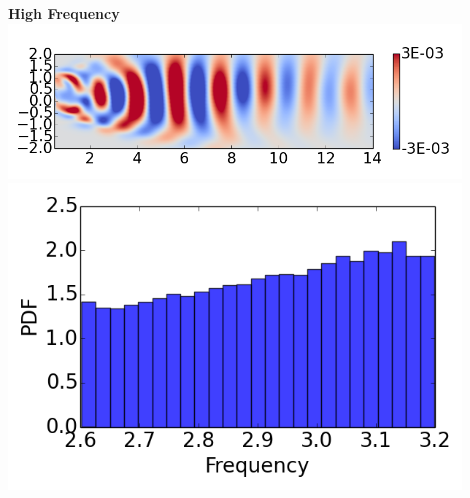\documentclass[9pt]{beamer}
\begin{document}
\begin{frame}
\begin{columns}[c]
   \centering
    \textbf{High Frequency} \\
    \includegraphics[width=0.9\textwidth]{DMDMode3} \\
    \includegraphics[width=0.9\textwidth]{PerturbDMDEigFastPDF}
\end{columns}
\end{frame}
\end{document}
